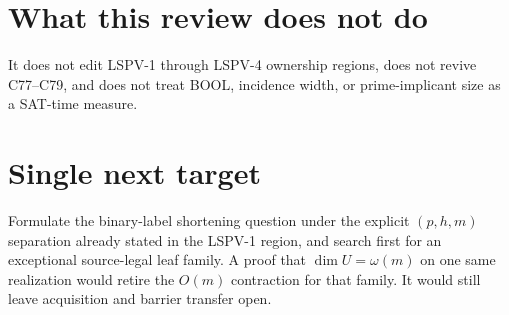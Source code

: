 \documentclass[11pt]{article}
\begin{document}
\section*{What this review does not do}
It does not edit LSPV-1 through LSPV-4 ownership regions, does not revive C77--C79,
and does not treat BOOL, incidence width, or prime-implicant size as a SAT-time
measure.

\section*{Single next target}
Formulate the binary-label shortening question under the explicit \((p,h,m)\)
separation already stated in the LSPV-1 region, and search first for an
exceptional source-legal leaf family. A proof that \(\dim U=\omega(m)\) on one
same realization would retire the \(O(m)\) contraction for that family. It would
still leave acquisition and barrier transfer open.

\end{document}
